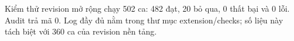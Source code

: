 Kiểm thử revision mở rộng chạy 502 ca: 482 đạt, 20 bỏ qua, 0 thất bại và 0 lỗi. Audit trả mã 0. Log đầy đủ nằm trong thư mục extension/checks; số liệu này tách biệt với 360 ca của revision nền tảng.
